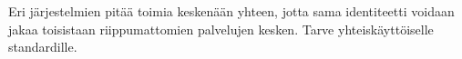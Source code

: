 \documentclass[finnish,gradu]{tktltiki}
\begin{document}
  Eri järjestelmien pitää toimia keskenään yhteen, jotta sama identiteetti voidaan jakaa toisistaan riippumattomien palvelujen kesken. Tarve yhteiskäyttöiselle standardille.






\end{document}
